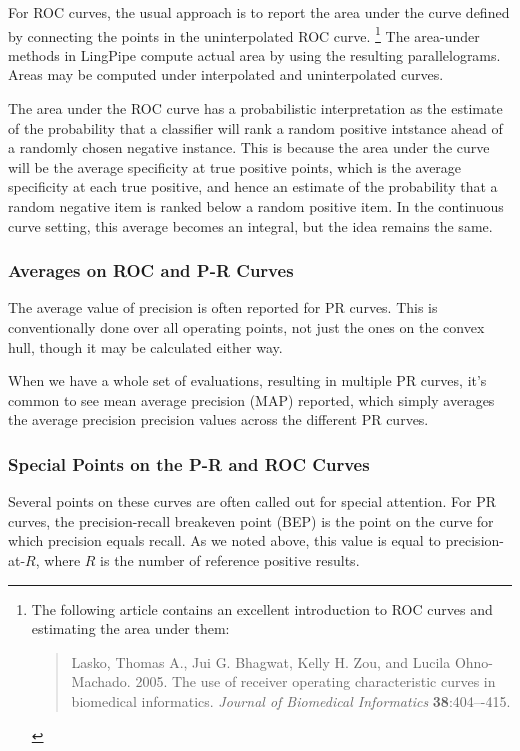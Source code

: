 For ROC curves, the usual approach is to report the area under the
curve defined by connecting the points in the uninterpolated ROC
curve.%
%
\footnote{The following article contains an excellent introduction to
  ROC curves and estimating the area under them: 
\begin{quote}
Lasko, Thomas A., Jui
  G. Bhagwat, Kelly H. Zou, and Lucila Ohno-Machado.  2005. The use
  of receiver operating characteristic curves in biomedical
  informatics.  {\it Journal of Biomedical Informatics}
  {\bf 38}:404–-415.
\end{quote}}
%
The area-under methods in LingPipe compute actual area by using the
resulting parallelograms.  Areas may be computed under interpolated
and uninterpolated curves.

The area under the ROC curve has a probabilistic interpretation as the
estimate of the probability that a classifier will rank a random
positive intstance ahead of a randomly chosen negative instance.  This
is because the area under the curve will be the average specificity
at true positive points, which is the average specificity at each
true positive, and hence an estimate of the probability that a random
negative item is ranked below a random positive item.  In the continuous
curve setting, this average becomes an integral, but the idea remains
the same.


\subsubsection{Averages on ROC and P-R Curves}

The average value of precision is often reported for PR curves.  This
is conventionally done over all operating points, not just the ones on
the convex hull, though it may be calculated either way.  

When we have a whole set of evaluations, resulting in multiple PR
curves, it's common to see mean average precision (MAP) reported,
which simply averages the average precision precision values across
the different PR curves.


\subsubsection{Special Points on the P-R and ROC Curves}

Several points on these curves are often called out for special
attention.  For PR curves, the precision-recall breakeven point (BEP)
is the point on the curve for which precision equals recall.  As
we noted above, this value is equal to precision-at-$R$, where
$R$ is the number of reference positive results.

